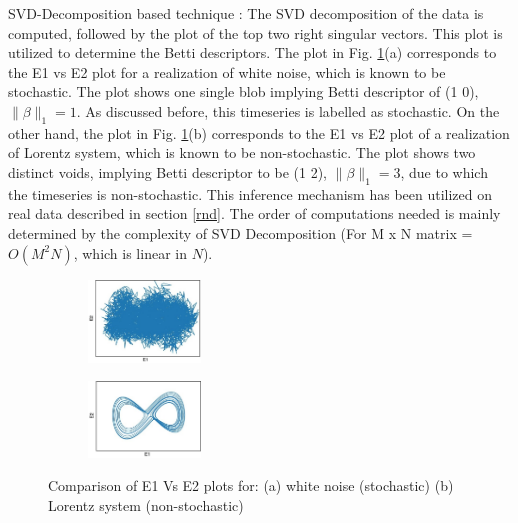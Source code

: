 \documentclass[journal]{IEEEtran}
\begin{document}
	SVD-Decomposition based technique : The SVD decomposition of the data is computed, followed by the plot of the top two right singular vectors. This plot is utilized to determine the Betti descriptors. The plot in Fig. \ref{e1e2plots}(a) corresponds to the E1 vs E2 plot for a realization of white noise, which is known to be stochastic. The plot shows one single blob implying Betti descriptor of (1 0), $\|\beta\|_1 = 1$. As discussed before, this timeseries is labelled as stochastic. On the other hand, the plot in Fig. \ref{e1e2plots}(b) corresponds to the E1 vs E2 plot of a realization of Lorentz system, which is known to be non-stochastic.  The plot shows two distinct voids, implying Betti descriptor to be (1 2), $\|\beta\|_1 = 3$, due to which the timeseries is non-stochastic. This inference mechanism has been utilized on real data described in section \ref{rnd}.
	The order of computations needed is mainly determined by the complexity of SVD Decomposition (For M x N matrix = $O(M^2N)$, which is linear in $N$).

%		
%		

\begin{figure}
	\centering
	
	\begin{subfigure}[]
		\centering
		\includegraphics[width=3cm]{svd_white_noise_crop.jpg}
	\end{subfigure}
	\begin{subfigure}[]
		\centering
		\includegraphics[width=3cm]{Lorenz_e1_vs_e2_2_2.JPG}
	\end{subfigure}
	\caption{Comparison of E1 Vs E2 plots for: (a) white noise (stochastic) (b) Lorentz system (non-stochastic)}
	\label{e1e2plots}
	\end{figure}
	
\end{document}
